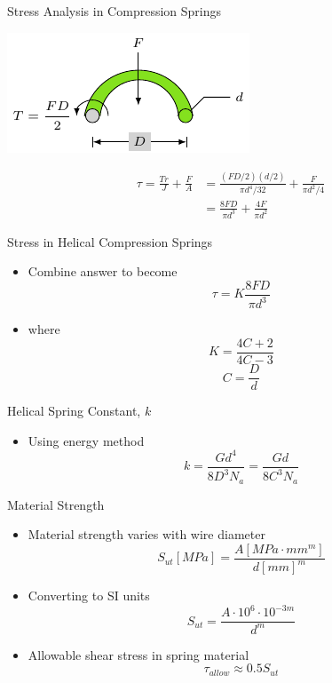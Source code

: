 \documentclass[10pt, svgnames]{beamer}
\begin{document}
\begin{frame}[label={sec:org7287d60}]{Stress Analysis in Compression Springs}
\begin{center}
\includegraphics[width=.9\linewidth]{pictures/comp-spring-stress-analysis.pdf}
\end{center}

\vspace{0.5cm}
\normalsize
\begin{align*}
  \tau = \frac{Tr}{J} + \frac{F}{A} &= \frac{(FD/2)(d/2)}{\pi d^4 / 32} +
                                      \frac{F}{\pi d^2 / 4} \\
                                    &= \frac{8FD}{\pi d^3} + \frac{4F}{\pi d^2}
\end{align*}
\end{frame}

\begin{frame}[label={sec:org8aec31b}]{Stress in Helical Compression Springs}
\begin{itemize}
\item Combine answer to become
$$ \tau = K \frac{8FD}{\pi d^3} $$
\item where
$$ K = \frac{4C+2}{4C-3} $$
$$ C = \frac{D}{d} $$
\end{itemize}
\end{frame}

\begin{frame}[label={sec:orgb7e646f}]{Helical Spring Constant, \(k\)}
\begin{itemize}
\item Using energy method
$$ k = \frac{Gd^4}{8D^3N_a} = \frac{Gd}{8C^3N_a} $$
\end{itemize}
\end{frame}

\begin{frame}[label={sec:orge0d18a6}]{Material Strength}
\begin{itemize}
\item Material strength varies with wire diameter
$$ S_{ut} [MPa] = \frac{A [MPa \cdot mm^m]}{d[mm]^m} $$
\item Converting to SI units
$$ S_{ut} = \frac{A \cdot 10^6 \cdot 10^{-3m}}{d^m} $$
\item Allowable shear stress in spring material
$$ \tau_{allow} \approx 0.5 S_{ut} $$
\end{itemize}
\end{frame}
\end{document}
